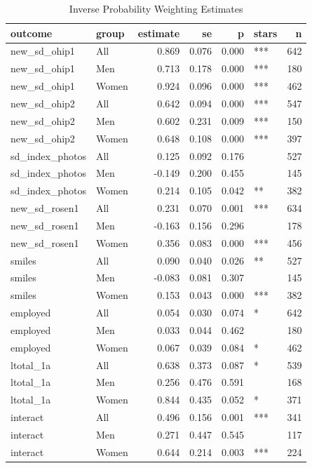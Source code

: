\begin{table}

\caption{Inverse Probability Weighting Estimates}
\centering
\begin{tabular}[t]{llrrrlr}
\toprule
outcome & group & estimate & se & p & stars & n\\
\midrule
new\_sd\_ohip1 & All & 0.869 & 0.076 & 0.000 & *** & 642\\
new\_sd\_ohip1 & Men & 0.713 & 0.178 & 0.000 & *** & 180\\
new\_sd\_ohip1 & Women & 0.924 & 0.096 & 0.000 & *** & 462\\
new\_sd\_ohip2 & All & 0.642 & 0.094 & 0.000 & *** & 547\\
new\_sd\_ohip2 & Men & 0.602 & 0.231 & 0.009 & *** & 150\\
\addlinespace
new\_sd\_ohip2 & Women & 0.648 & 0.108 & 0.000 & *** & 397\\
sd\_index\_photos & All & 0.125 & 0.092 & 0.176 &  & 527\\
sd\_index\_photos & Men & -0.149 & 0.200 & 0.455 &  & 145\\
sd\_index\_photos & Women & 0.214 & 0.105 & 0.042 & ** & 382\\
new\_sd\_rosen1 & All & 0.231 & 0.070 & 0.001 & *** & 634\\
\addlinespace
new\_sd\_rosen1 & Men & -0.163 & 0.156 & 0.296 &  & 178\\
new\_sd\_rosen1 & Women & 0.356 & 0.083 & 0.000 & *** & 456\\
smiles & All & 0.090 & 0.040 & 0.026 & ** & 527\\
smiles & Men & -0.083 & 0.081 & 0.307 &  & 145\\
smiles & Women & 0.153 & 0.043 & 0.000 & *** & 382\\
\addlinespace
employed & All & 0.054 & 0.030 & 0.074 & * & 642\\
employed & Men & 0.033 & 0.044 & 0.462 &  & 180\\
employed & Women & 0.067 & 0.039 & 0.084 & * & 462\\
ltotal\_1a & All & 0.638 & 0.373 & 0.087 & * & 539\\
ltotal\_1a & Men & 0.256 & 0.476 & 0.591 &  & 168\\
\addlinespace
ltotal\_1a & Women & 0.844 & 0.435 & 0.052 & * & 371\\
interact & All & 0.496 & 0.156 & 0.001 & *** & 341\\
interact & Men & 0.271 & 0.447 & 0.545 &  & 117\\
interact & Women & 0.644 & 0.214 & 0.003 & *** & 224\\

\end{tabular}
\end{table}
